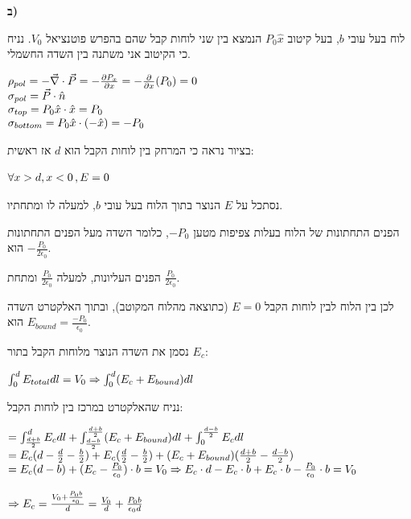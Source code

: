 \documentclass[14pt]{extarticle}
\makeatletter
\newenvironment{lefteqs}{%
    \begin{english}%
    \begin{flushleft}%
    \renewcommand{\arraystretch}{1.3}%
    $\begin{array}{@{}l@{}}%
}{%
    \end{array}$%
    \end{flushleft}%
    \end{english}%
}
\makeatother
\begin{document}
\textbf{ב)} 

לוח בעל עובי $b$, בעל קיטוב $P_0 \hat{x}$ הנמצא בין שני לוחות קבל שהם בהפרש פוטנציאל $V_0$.
נניח כי הקיטוב אני משתנה בין השדה החשמלי.

\begin{lefteqs}
    \rho_{pol} = -\vec{\nabla} \cdot \vec{P} = -\frac{\partial P_x}{\partial x} = -\frac{\partial}{\partial x} (P_0) = 0 \\
    \sigma_{pol} = \vec{P} \cdot \hat{n} \\
    \sigma_{top} = P_0 \hat{x} \cdot \hat{x} = P_0 \\
    \sigma_{bottom} = P_0 \hat{x} \cdot (-\hat{x}) = -P_0 \\
\end{lefteqs}

בציור נראה כי המרחק בין לוחות הקבל הוא $d$ אז ראשית:

\begin{lefteqs}
    \forall x>d, x<0 \, , E=0
\end{lefteqs}

נסתכל על $E$ הנוצר בתוך הלוח בעל עובי $b$, למעלה לו ומתחתיו.

הפנים התחתונות של הלוח בעלות צפיפות מטען $-P_0$, כלומר השדה מעל הפנים התחתונות הוא $-\frac{P_0}{2\epsilon_0}$.

הפנים העליונות, למעלה $\frac{P_0}{2\epsilon_0}$ ומתחת $\frac{P_0}{2\epsilon_0}$.

לכן בין הלוח לבין לוחות הקבל $E=0$ (כתוצאה מהלוח המקוטב), ובתוך האלקטרט השדה הוא $E_{bound} = \frac{-P_0}{\epsilon_0}$.

נסמן את השדה הנוצר מלוחות הקבל בתור $E_c$:

\begin{lefteqs}
    \int_0^d E_{total} dl = V_0 \Rightarrow \int_0^d (E_c + E_{bound}) dl
\end{lefteqs}

נניח שהאלקטרט במרכז בין לוחות הקבל:

\begin{lefteqs}
    = \int_{\frac{d+b}{2}}^d E_c dl + \int_{\frac{d-b}{2}}^{\frac{d+b}{2}} (E_c + E_{bound}) dl + \int_0^{\frac{d-b}{2}} E_c dl \\
    = E_c(d - \frac{d}{2} - \frac{b}{2}) + E_c(\frac{d}{2} - \frac{b}{2}) + (E_c + E_{bound})(\frac{d+b}{2} - \frac{d-b}{2}) \\
    = E_c(d-b) + (E_c - \frac{P_0}{\epsilon_0})\cdot b = V_0
    \Rightarrow E_c \cdot d - E_c \cdot b + E_c \cdot b -\frac{P_0}{\epsilon_0} \cdot b = V_0 \\ \\
    \Rightarrow E_c = \frac{V_0 + \frac{P_0 b}{\epsilon_0}}{d} = \frac{V_0}{d} + \frac{P_0 b}{\epsilon_0 d}
\end{lefteqs}
\end{document}

